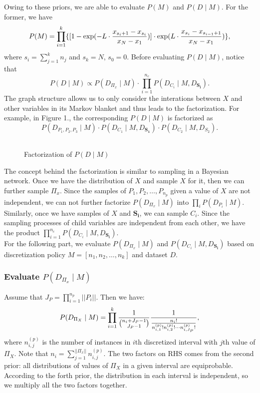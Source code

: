 {Owing to these priors, we are able to evaluate $P(M)$ and $P(D \mid M)$. For the former, we have
\begin{equation}
P(M) = \prod_{i=1}^k \{ [1 - {\exp(- L \cdot {{x_{s_i+1} - x_{s_i}}\over{x_N - x_1}})}] \cdot \exp(L \cdot {{x_{s_{i}} - x_{s_{i-1} + 1}}\over{x_N - x_1}}) \},
\end{equation}
where $s_i = \sum_{j=1}^k n_j$ and $s_k = N$, $s_0 = 0$. Before evaluating $P(D \mid M)$, notice that
\begin{equation}
P(D \mid M) \propto P(D_{\Pi_x} \mid M) \cdot \prod_{i = 1}^{n_c} P(D_{C_i} \mid M, D_{\boldsymbol{S_i}}).
\end{equation}
The graph structure allows us to only consider the interations between $X$ and other variables in its Markov blanket and thus leads to the factorization. For example, in Figure 1., the corresponding $P(D \mid M)$ is factorized as
\begin{equation}
P(D_{ P_1,P_2,P_3 } \mid M) \cdot P( D_{ C_1 } \mid M,D_{\boldsymbol{S_1}}) \cdot P(D_{C_2} \mid M,D_{ S_2  }).
\end{equation}

\begin{figure}[ht]
    \begin{tabular}{cc}
      
    \end{tabular}
  \caption{Factorization of $P(D \mid M)$}
\end{figure}


The concept behind the factorization is similar to sampling in a Bayesian network. Once we have the distribution of $X$ and sample $X$ for it, then we can further sample $\Pi_x$. Since the samples of $P_1,P_2,\ldots,P_{n_p}$ given a value of $X$ are not independent, we can not further factorize $P(D_{\Pi_x} \mid M)$ into $\prod_i P(D_{P_i} \mid M)$. Similarly, once we have samples of $X$ and $\boldsymbol{S_i}$, we can sample $C_i$. Since the sampling processes of child variables are independent from each other, we have the product $\prod_{i = 1}^{n_c} P(D_{C_i} \mid M, D_{\boldsymbol{S_i}})$.\\

For the following part, we evaluate $P(D_{\Pi_x} \mid M)$  and $P(D_{C_i} \mid M, D_{\boldsymbol{S_i}})$ based on discretization policy $M = [n_1,n_2,\ldots,n_k]$ and dataset $D$.
\subsubsection{Evaluate $P(D_{\Pi_x} \mid M)$}
Assume that $J_P = \prod_{i=1}^{n_p} || P_i ||$. Then we have:
\begin{equation}
P(D_{\Pi_X} \mid M) = \prod_{i=1}^k  {{1}\over{{n_i + J_P - 1}\choose{J_P -1}}}
{{1}\over{ {{{n}_i}!}\over{ {n^{(p)}_{i,1} !} {n^{(p)}_{i,2} !} \cdots {n^{(p)}_{i,J_P} !}}  }},
\end{equation}
where $n^{(p)}_{i,j}$ is the number of instances in $i$th discretized interval with $j$th value of $\Pi_X$. Note that $n_i = \sum_{j=1}^{|| \Pi_x ||} n^{(p)}_{i,j}$. The two factors on RHS comes from the second prior: all distributions of values of $\Pi_X$ in a given interval are equiprobable. According to the forth prior, the distribution in each interval is independent, so we multiply all the two factors together.
}
